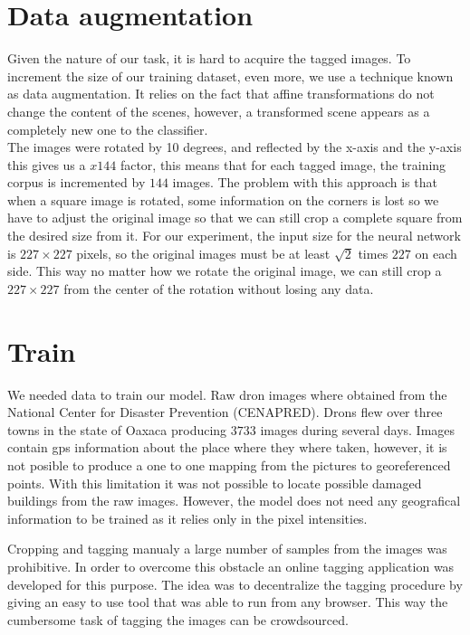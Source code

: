 \section{Data augmentation}

Given the nature of our task, it is hard to acquire the tagged images. To increment the size of our training dataset, even more, we use a technique known as data augmentation. It relies on the fact that affine transformations do not change the content of the scenes, however, a transformed scene appears as a completely new one to the classifier.\\

The images were rotated by 10 degrees, and reflected by the x-axis and the y-axis this gives us a $x144$ factor, this means that for each tagged image, the training corpus is incremented by $144$ images. The problem with this approach is that when a square image is rotated, some information on the corners is lost so we have to adjust the original image so that we can still crop a complete square from the desired size from it. For our experiment, the input size for the neural network is $227\times 227$ pixels, so the original images must be at least $\sqrt{2}$ times $227$ on each side. This way no matter how we rotate the original image, we can still crop a $227\times 227$ from the center of the rotation without losing any data.\\



\section{Train}

We needed data to train our model. Raw dron images where obtained from the National Center for Disaster Prevention (CENAPRED). Drons flew over three towns in the state of Oaxaca producing $3733$ images during several days. Images contain gps information about the place where they where taken, however, it is not posible to produce a one to one mapping from the pictures to georeferenced points. With this limitation it was not possible to locate possible damaged buildings from the raw images. However, the model does not need any geografical information to be trained as it relies only in the pixel intensities.

Cropping and tagging manualy a large number of samples from the images was prohibitive. In order to overcome this obstacle an online tagging application was developed for this purpose. The idea was to decentralize the tagging procedure by giving an easy to use tool that was able to run from any browser. This way the cumbersome task of tagging the images can be crowdsourced.

